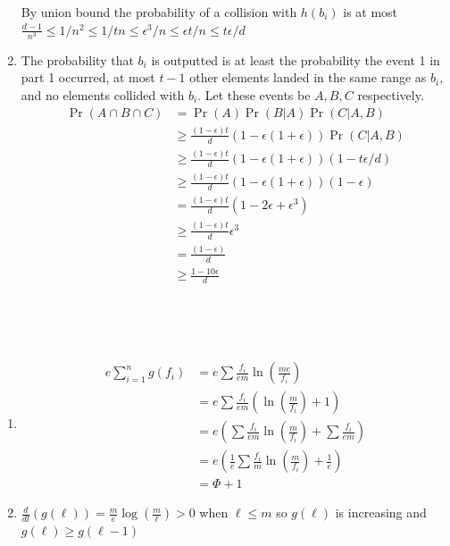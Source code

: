 \documentclass[11pt]{article}%
\begin{document}
\begin{questions}[1]
\begin{enumerate}
    By union bound the probability of a collision with $h(b_i)$ is at most $\frac{d-1}{n^3} \leq 1/n^2 \leq 1/tn \leq \epsilon^3/n \leq \epsilon t/n \leq t\epsilon/d$ 
    \item The probability that $b_i$ is outputted is at least the probability the event 1 in part 1 occurred, at most $t-1$ other elements landed in the same range as $b_i$, and no elements collided with $b_i$. Let these events be $A, B,C$ respectively. \\
    \begin{align*}
        \Pr(A \cap B \cap C) &= \Pr(A) \Pr(B | A) \Pr(C | A, B) \\
        &\geq \frac{(1- \epsilon)t}{d} (1 - \epsilon(1 + \epsilon))\Pr(C | A, B) \\
         &\geq \frac{(1- \epsilon)t}{d} (1 - \epsilon(1 + \epsilon))(1 - t\epsilon/d) \tag{3 gives upper bound on the complement of $C | A, B$} \\
         &\geq \frac{(1- \epsilon)t}{d} (1 - \epsilon(1 + \epsilon))(1 - \epsilon) \\
         &= \frac{(1- \epsilon)t}{d} (1 - 2 \epsilon + \epsilon^3) \\
         &\geq \frac{(1- \epsilon)t}{d} \epsilon^3 \tag{$\epsilon$ < 1/2} \\
         &= \frac{(1- \epsilon)}{d} \\
         &\geq \frac{1 - 10 \epsilon}{d}
    \end{align*}
    \end{enumerate}
    \\
    \item
    \\
    \begin{enumerate}
    \\
    \item  
    \begin{align*}
        e \sum_{i = 1}^{n} g(f_i) &= e \sum \frac{f_i}{em} \ln(\frac{me}{f_i}) \\
        &= e\sum \frac{f_i}{em} (\ln(\frac{m}{f_i}) + 1) \\
        &= e(\sum \frac{f_i}{em} \ln(\frac{m}{f_i}) + \sum \frac{f_i}{em}) \\
        &= e(\frac{1}{e} \sum \frac{f_i}{m} \ln(\frac{m}{f_i}) + \frac{1}{e}) \\
        &= \Phi + 1
    \end{align*}
    \item
    $\frac{d}{dl}(g(\ell)) = \frac{m}{e}\log(\frac{m}{\ell}) > 0$ when $\ell \leq m$ so $g(\ell)$ is increasing and $g(\ell) \geq g(\ell - 1)$

\end{enumerate}
\end{questions}
\end{document}
